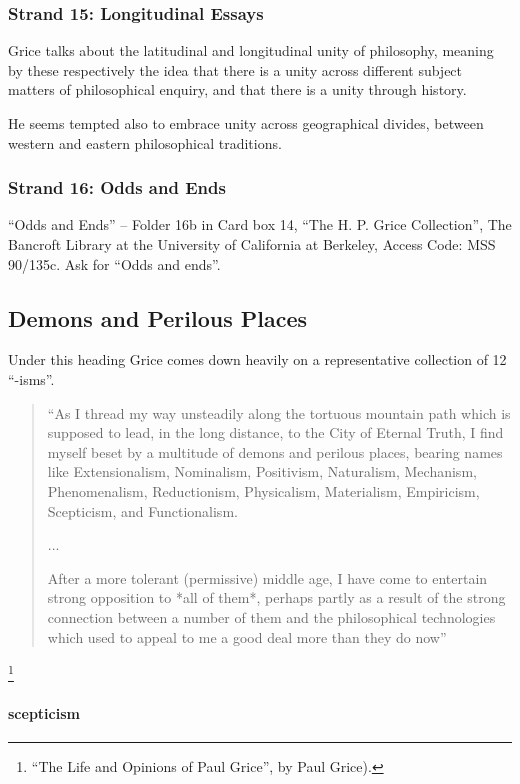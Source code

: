 \documentclass[10pt,titlepage]{book}
\begin{document}
\subsubsection{Strand 15: Longitudinal Essays}

Grice talks about the latitudinal and longitudinal unity of philosophy, meaning by these respectively the idea that there is a unity across different subject matters of philosophical enquiry, and that there is a unity through history.

He seems tempted also to embrace unity across geographical divides, between western and eastern philosophical traditions.

\subsubsection{Strand 16: Odds and Ends}

``Odds and Ends'' -- Folder 16b in Card box 14, ``The H. P. Grice Collection'', The Bancroft Library at the University of California at Berkeley, Access Code: MSS 90/135c.
Ask for ``Odds and ends''.

\subsection{Demons and Perilous Places}\label{demons}

Under this heading Grice comes down heavily on a representative collection of 12 ``-isms''.

\begin{quote}
``As I thread my way unsteadily along the tortuous mountain 
path which is supposed to lead, in the long distance, to the City of Eternal Truth, I find myself beset by a  
multitude of demons and perilous places, bearing names like  
Extensionalism, Nominalism, Positivism, Naturalism, Mechanism,  
Phenomenalism, Reductionism, Physicalism, Materialism,  
Empiricism, Scepticism, and Functionalism.

...

After a more tolerant (permissive) middle age, I have come to entertain strong opposition to *all of them*, perhaps partly as a result of the strong connection between a number of them and the philosophical technologies which used to appeal to me a good deal more than they do  now''
\end{quote}
\footnote{``The Life and Opinions of Paul Grice'', by Paul Grice).\cite{grice86c}}

\paragraph{scepticism}
\end{document}
